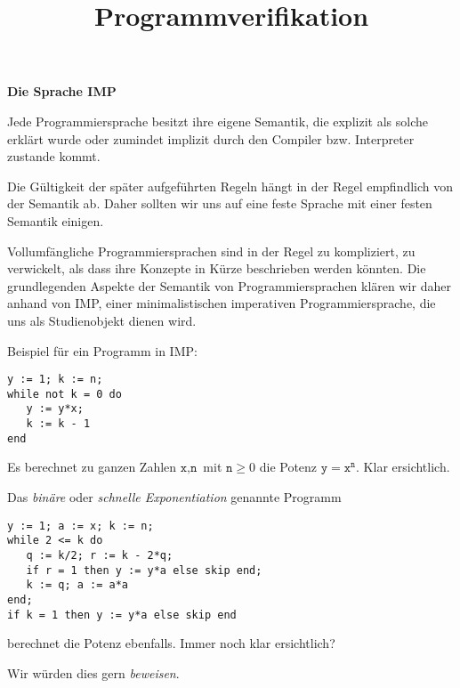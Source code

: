 \documentclass[8pt,fleqn,aspectratio=169]{beamer}
\title{Programmverifikation}
\date{}
\newcommand{\strong}[1]{\textsf{\textbf{#1}}}
\newcommand{\centerheadline}[1]{%
  \begin{center}\strong{#1}\end{center}}
\newcommand{\parspace}{\vspace{0.8em}}
\newcommand{\code}[1]{{\texttt{#1}}}
\begin{document}
\begin{frame}
\maketitle
\end{frame}

\begin{frame}
\centerheadline{Die Sprache IMP}
\end{frame}

\begin{frame}
Jede Programmiersprache besitzt ihre eigene Semantik, die explizit
als solche erklärt wurde oder zumindet implizit durch den Compiler
bzw. Interpreter zustande kommt.\pause

\parspace
Die Gültigkeit der später aufgeführten Regeln hängt in der Regel
empfindlich von der Semantik ab. Daher sollten wir uns auf eine feste
Sprache mit einer festen Semantik einigen.\pause

\parspace
Vollumfängliche Programmiersprachen sind in der Regel zu kompliziert, zu
verwickelt, als dass ihre Konzepte in Kürze beschrieben werden könnten.
Die grundlegenden Aspekte der Semantik von Programmiersprachen klären
wir daher anhand von IMP, einer minimalistischen imperativen
Programmiersprache, die uns als Studienobjekt dienen wird.
\end{frame}

\begin{frame}[fragile]

Beispiel für ein Programm in IMP:
\begin{lstlisting}[language=IMP, xleftmargin=\mathindent]
y := 1; k := n;
while not k = 0 do
   y := y*x;
   k := k - 1
end
\end{lstlisting}\pause
Es berechnet zu ganzen Zahlen $\code{x},\code{n}$ mit $\code{n}\ge 0$
die Potenz $\code{y} = \code{x}^\code{n}$. Klar ersichtlich.\pause

\parspace
Das \emph{binäre} oder \emph{schnelle Exponentiation} genannte Programm
\begin{lstlisting}[language=IMP, xleftmargin=\mathindent]
y := 1; a := x; k := n;
while 2 <= k do
   q := k/2; r := k - 2*q;
   if r = 1 then y := y*a else skip end;
   k := q; a := a*a
end;
if k = 1 then y := y*a else skip end
\end{lstlisting}
berechnet die Potenz ebenfalls. Immer noch klar ersichtlich?

\parspace
Wir würden dies gern \emph{beweisen}.
\end{frame}
\end{document}
